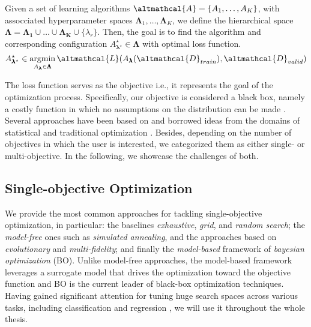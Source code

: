 \begin{definition}
    Given a set of learning algorithms $\altmathcal{A} = \{A_1, \dots, A_K\}$, with assocciated hyperparameter spaces  $\pmb{\Lambda}_1, \dots, \pmb{\Lambda}_K$, we define the hierarchical space $\pmb{\Lambda} = \pmb{\Lambda_1} \cup \dots \cup \pmb{\Lambda_K} \cup \{\lambda_r\}$. Then, the goal is to find the algorithm and corresponding configuration $A^{\star}_{\pmb{\lambda}^{\star}} \in \pmb{\Lambda}$ with optimal loss function.
    \begin{equation*}
        A^{\star}_{\pmb{\lambda}^{\star}} \in \argmin_{A_{\pmb{\lambda}} \in \pmb{\Lambda}} \altmathcal{L}(A_{\pmb{\lambda}}(\altmathcal{D}_{train}), \altmathcal{D}_{valid})
    \end{equation*}
\end{definition}

The loss function serves as the objective i.e., it represents the goal of the optimization process.
Specifically, our objective is considered a black box, namely a costly function in which no assumptions on the distribution can be made \cite{69, 134, 88, 55}.
Several approaches have been based on and borrowed ideas from the domains of statistical and traditional optimization \cite{opt_algos}.
Besides, depending on the number of objectives in which the user is interested, we categorized them as either single- or multi-objective.
In the following, we showcase the challenges of both.

\subsection{Single-objective Optimization}

We provide the most common approaches for tackling single-objective optimization, in particular: the baselines \textit{exhaustive}, \textit{grid}, and \textit{random search};  the \textit{model-free} ones such as \textit{simulated annealing}, and the approaches based on \textit{evolutionary} and \textit{multi-fidelity}; and finally the \textit{model-based} framework of \textit{bayesian optimization} (BO).
Unlike model-free approaches, the model-based framework leverages a surrogate model that drives the optimization toward the objective function and BO is the current leader of black-box optimization techniques.
Having gained significant attention for tuning huge search spaces across various tasks, including classification and regression \cite{113, 112}, we will use it throughout the whole thesis.

